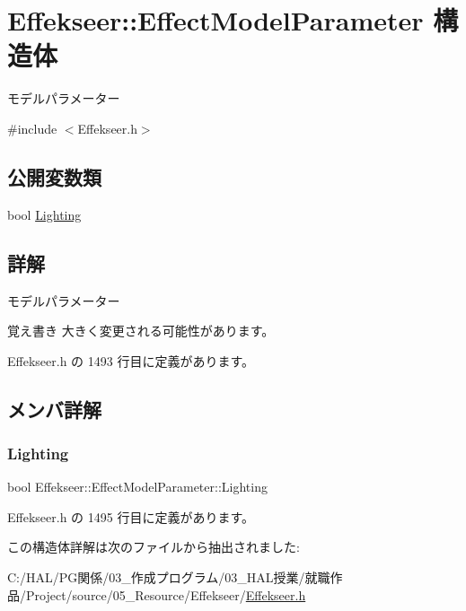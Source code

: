 \hypertarget{struct_effekseer_1_1_effect_model_parameter}{}\section{Effekseer\+:\+:Effect\+Model\+Parameter 構造体}
\label{struct_effekseer_1_1_effect_model_parameter}


モデルパラメーター  




{\ttfamily \#include $<$Effekseer.\+h$>$}

\subsection*{公開変数類}
\begin{DoxyCompactItemize}
\item 
bool \mbox{\hyperlink{struct_effekseer_1_1_effect_model_parameter_a643065cc16447ee7cccacc4a3279da06}{Lighting}}
\end{DoxyCompactItemize}


\subsection{詳解}
モデルパラメーター 

\begin{DoxyNote}{覚え書き}
大きく変更される可能性があります。 
\end{DoxyNote}


 Effekseer.\+h の 1493 行目に定義があります。



\subsection{メンバ詳解}
\mbox{\label{struct_effekseer_1_1_effect_model_parameter_a643065cc16447ee7cccacc4a3279da06}} 
\subsubsection{\texorpdfstring{Lighting}{Lighting}}
{\footnotesize\ttfamily bool Effekseer\+::\+Effect\+Model\+Parameter\+::\+Lighting}



 Effekseer.\+h の 1495 行目に定義があります。



この構造体詳解は次のファイルから抽出されました\+:\begin{DoxyCompactItemize}
\item 
C\+:/\+H\+A\+L/\+P\+G関係/03\+\_\+作成プログラム/03\+\_\+\+H\+A\+L授業/就職作品/\+Project/source/05\+\_\+\+Resource/\+Effekseer/\mbox{\hyperlink{_effekseer_8h}{Effekseer.\+h}}\end{DoxyCompactItemize}
